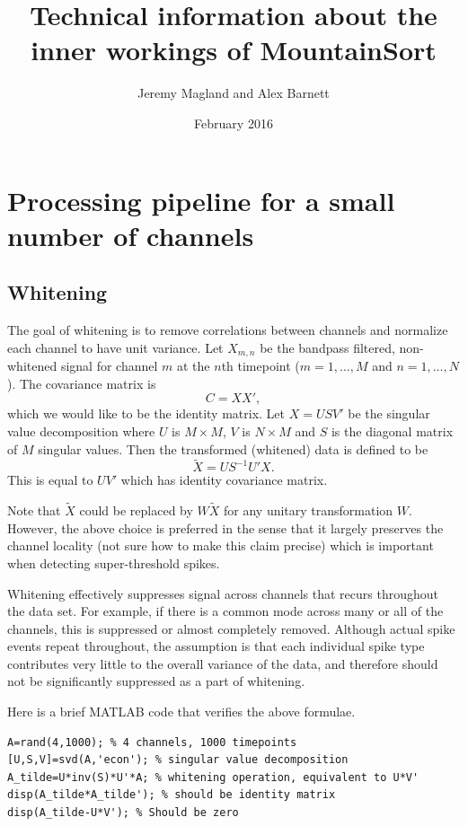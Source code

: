 \documentclass{article}
\title{Technical information about the inner workings of MountainSort}
\author{Jeremy Magland and Alex Barnett}
\date{February 2016}
\begin{document}
\maketitle

\section{Processing pipeline for a small number of channels}

\subsection{Whitening}

The goal of whitening is to remove correlations between channels and normalize each channel to have unit variance. Let $X_{m,n}$ be the bandpass filtered, non-whitened signal for channel $m$ at the $n$th timepoint ($m=1,\dots,M$ and $n=1,\dots,N$). The covariance matrix is
$$C=X X',$$
which we would like to be the identity matrix. Let
$X=USV'$ be the singular value decomposition where $U$ is $M\times M$, $V$ is $N\times M$ and $S$ is the diagonal matrix of $M$ singular values.
Then the transformed (whitened) data is defined to be
$$\tilde{X}=US^{-1}U'X.$$
This is equal to $UV'$ which has identity covariance matrix.

Note that $\tilde{X}$ could be replaced by $W\tilde{X}$ for any unitary transformation $W$. However, the above choice is preferred in the sense that it largely preserves the channel locality (not sure how to make this claim precise) which is important when detecting super-threshold spikes.

Whitening effectively suppresses signal across channels that recurs throughout the data set. For example, if there is a common mode across many or all of the channels, this is suppressed or almost completely removed. Although actual spike events repeat throughout, the assumption is that each individual spike type contributes very little to the overall variance of the data, and therefore should not be significantly suppressed as a part of whitening.

Here is a brief MATLAB code that verifies the above formulae.

\begin{lstlisting}
A=rand(4,1000); % 4 channels, 1000 timepoints
[U,S,V]=svd(A,'econ'); % singular value decomposition
A_tilde=U*inv(S)*U'*A; % whitening operation, equivalent to U*V'
disp(A_tilde*A_tilde'); % should be identity matrix
disp(A_tilde-U*V'); % Should be zero
\end{lstlisting}
\end{document}
